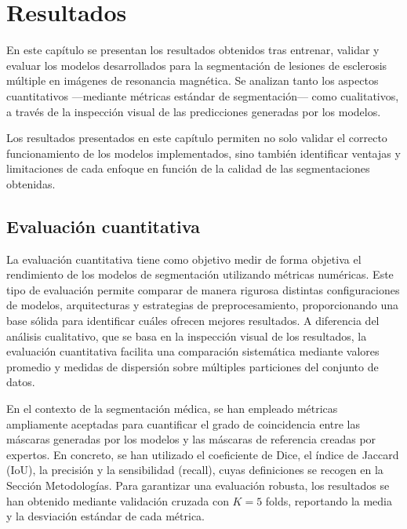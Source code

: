 \documentclass[../main.tex]{subfiles}
\begin{document}
\section{Resultados}
En este capítulo se presentan los resultados obtenidos tras entrenar, validar y evaluar los modelos desarrollados para la segmentación de lesiones de esclerosis múltiple en imágenes de resonancia magnética. Se analizan tanto los aspectos cuantitativos —mediante métricas estándar de segmentación— como cualitativos, a través de la inspección visual de las predicciones generadas por los modelos.

Los resultados presentados en este capítulo permiten no solo validar el correcto funcionamiento de los modelos implementados, sino también identificar ventajas y limitaciones de cada enfoque en función de la calidad de las segmentaciones obtenidas.


\subsection{Evaluación cuantitativa}
La evaluación cuantitativa tiene como objetivo medir de forma objetiva el rendimiento de los modelos de segmentación utilizando métricas numéricas. Este tipo de evaluación permite comparar de manera rigurosa distintas configuraciones de modelos, arquitecturas y estrategias de preprocesamiento, proporcionando una base sólida para identificar cuáles ofrecen mejores resultados. A diferencia del análisis cualitativo, que se basa en la inspección visual de los resultados, la evaluación cuantitativa facilita una comparación sistemática mediante valores promedio y medidas de dispersión sobre múltiples particiones del conjunto de datos.

En el contexto de la segmentación médica, se han empleado métricas ampliamente aceptadas para cuantificar el grado de coincidencia entre las máscaras generadas por los modelos y las máscaras de referencia creadas por expertos. En concreto, se han utilizado el coeficiente de Dice, el índice de Jaccard (IoU), la precisión y la sensibilidad (recall), cuyas definiciones se recogen en la Sección Metodologías. Para garantizar una evaluación robusta, los resultados se han obtenido mediante validación cruzada con $K=5$ folds, reportando la media y la desviación estándar de cada métrica.
\end{document}
